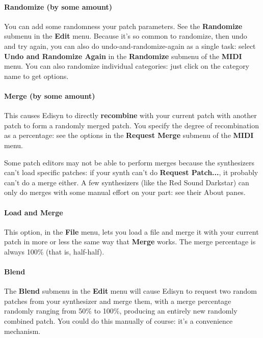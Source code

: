 \documentclass{article}
\begin{document}
\paragraph{Randomize (by some amount)}  You can add some randomness your patch parameters.  See the {\bf Randomize} submenu in the {\bf Edit} menu.   Because it's so common to randomize, then undo and try again, you can also do undo-and-randomize-again as a single task: select {\bf Undo and Randomize Again} in the {\bf Randomize} submenu of the {\bf MIDI} menu.    You can also randomize individual categories: just click on the category name to get options.

\vspace{-0.6em}
\paragraph{Merge (by some amount)}  This causes Edisyn to directly {\bf recombine}  with your current patch with another patch to form a randomly merged patch.  You specify the degree of recombination as a percentage: see the options in the {\bf Request Merge} submenu of the {\bf MIDI} menu.

Some patch editors may not be able to perform merges because the synthesizers can't load specific patches: if your synth can't do {\bf Request Patch...}, it probably can't do a merge either.  A few synthesizers (like the Red Sound Darkstar) can only do merges with some manual effort on your part: see their About panes.

\vspace{-0.6em}
\paragraph{Load and Merge}  This option, in the {\bf File} menu, lets you load a file and merge it with your current patch in more or less the same way that {\bf Merge} works.  The merge percentage is always 100\% (that is, half-half).

\vspace{-0.6em}
\paragraph{Blend}  The {\bf Blend} submenu in the {\bf Edit} menu will cause Edisyn to request two random patches from your synthesizer and merge them, with a merge percentage randomly ranging from 50\% to 100\%, producing an entirely new randomly combined patch.  You could do this manually of course: it's a convenience mechanism.  
\end{document}
